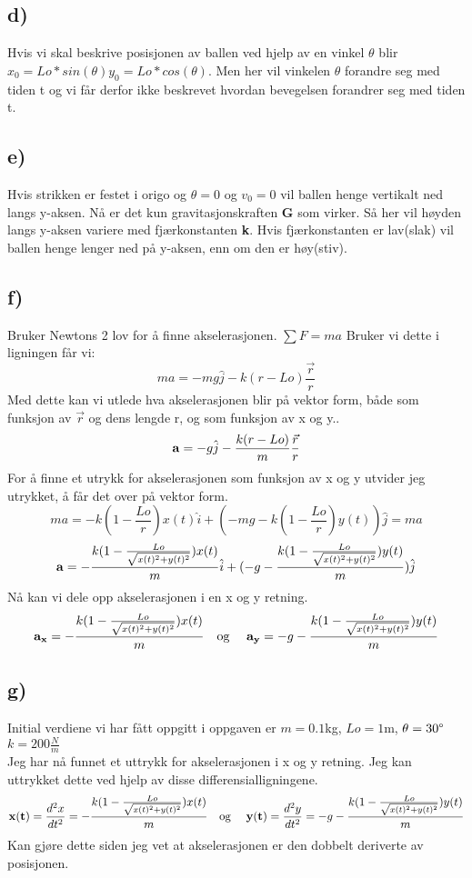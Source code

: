 \documentclass[a4paper,12pt,norsk]{article}
\begin{document}
\subsection*{d)}
Hvis vi skal beskrive posisjonen av ballen ved hjelp av en vinkel $\theta$ blir $x_0 = Lo*sin(\theta) y_0 = Lo*cos(\theta)$. Men her vil vinkelen $\theta$ forandre seg med tiden t og vi får derfor ikke beskrevet hvordan bevegelsen forandrer seg med tiden t. 

\subsection*{e)}
Hvis strikken er festet i origo og $\theta = 0$ og $v_0 =0$ vil ballen henge vertikalt ned langs y-aksen. Nå er det kun gravitasjonskraften \textbf{G} som virker. Så her vil høyden langs y-aksen variere med fjærkonstanten \textbf{k}. Hvis fjærkonstanten er lav(slak) vil ballen henge lenger ned på y-aksen, enn om den er høy(stiv). 

\subsection*{f)}
Bruker Newtons 2 lov for å finne akselerasjonen. $\sum{F} = ma$ Bruker vi dette i ligningen får vi:
$$ma = -mg\hat{j} - k(r - Lo)\frac{\vec{r}}{r}$$
Med dette kan vi utlede hva akselerasjonen blir på vektor form, både som funksjon av $\vec{r}$ og dens lengde r, og som funksjon av x og y..
$$\bold{a} = -g\hat{j} - \frac{k(r - Lo)}{m}\frac{\vec{r}}{r}$$
For å finne et utrykk for akselerasjonen som funksjon av x og y utvider jeg utrykket, å får det over på vektor form.
$$ ma = - k(1 - \frac{Lo}{r})x(t)\hat{i} + (-mg- k(1 - \frac{Lo}{r})y(t))\hat{j} = ma$$
$$\bold{a} = - \frac{k(1 - \frac{Lo}{\sqrt{x(t)^2 + y(t)^2}})x(t)}{m}\hat{i} + (-g- \frac{k(1 - \frac{Lo}{\sqrt{x(t)^2 + y(t)^2}})y(t)}{m})\hat{j}$$
Nå kan vi dele opp akselerasjonen i en x og y retning. \\
$$\bold{a_x} = - \frac{k(1 - \frac{Lo}{\sqrt{x(t)^2 + y(t)^2}})x(t)}{m} \quad \textrm{og } \quad \bold{a_y} = -g- \frac{k(1 - \frac{Lo}{\sqrt{x(t)^2 + y(t)^2}})y(t)}{m}$$

\subsection*{g)}
Initial verdiene vi har fått oppgitt i oppgaven er $m = 0.1$kg, $Lo = 1$m, $\theta = 30\degree $ 
$k = 200\frac{N}{m}$ \\
Jeg har nå funnet et uttrykk for akselerasjonen i x og y retning. Jeg kan uttrykket dette ved hjelp av disse differensialligningene.
$$\bold{x(t)} =\frac{d^2x}{dt^2} = - \frac{k(1 - \frac{Lo}{\sqrt{x(t)^2 + y(t)^2}})x(t)}{m} \quad \textrm{og } \quad \bold{y(t)}= \frac{d^2y}{dt^2}  = -g- \frac{k(1 - \frac{Lo}{\sqrt{x(t)^2 + y(t)^2}})y(t)}{m}$$
Kan gjøre dette siden jeg vet at akselerasjonen er den dobbelt deriverte av posisjonen.
\end{document}
